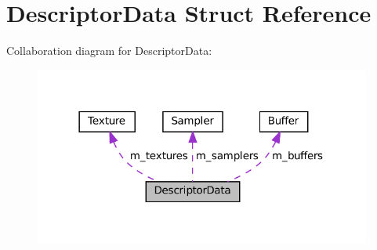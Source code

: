 \hypertarget{structDescriptorData}{}\section{Descriptor\+Data Struct Reference}
\label{structDescriptorData}


Collaboration diagram for Descriptor\+Data\+:
\nopagebreak
\begin{figure}[H]
\begin{center}
\leavevmode
\includegraphics[width=314pt]{structDescriptorData__coll__graph}
\end{center}
\end{figure}
